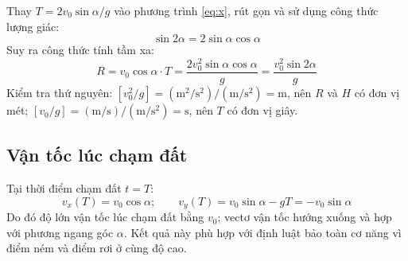 Thay $T = 2v_0\sin\alpha/g$ vào phương trình \eqref{eq:x}, rút gọn và sử dụng công thức lượng giác:
\[ \sin 2\alpha = 2\sin\alpha\cos\alpha \]
Suy ra công thức tính tầm xa:
\begin{equation}
  R = v_0\cos\alpha\cdot T = \frac{2v_0^2\sin\alpha\cos\alpha}{g} = \frac{v_0^2\sin 2\alpha}{g}
  \label{eq:R}
\end{equation}
Kiểm tra thứ nguyên: $[v_0^2/g] = (\mathrm{m^2/s^2})/(\mathrm{m/s^2}) = \mathrm{m}$, nên $R$ và $H$ có đơn vị mét; $[v_0/g] = (\mathrm{m/s})/(\mathrm{m/s^2}) = \mathrm{s}$, nên $T$ có đơn vị giây.

\subsection{Vận tốc lúc chạm đất}
Tại thời điểm chạm đất $t = T$:
\[ v_x(T) = v_0\cos\alpha; \qquad v_y(T) = v_0\sin\alpha - gT = -v_0\sin\alpha \]
Do đó độ lớn vận tốc lúc chạm đất bằng $v_0$; vectơ vận tốc hướng xuống và hợp với phương ngang góc $\alpha$. Kết quả này phù hợp với định luật bảo toàn cơ năng vì điểm ném và điểm rơi ở cùng độ cao.
